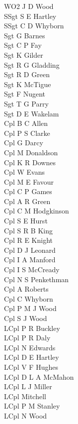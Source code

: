 \begin{multicols}{2}
  \noindent
  WO2 J D Wood \\
  SSgt S E Hartley \\
  SSgt C D Whyborn \\
  Sgt G Barnes \\
  Sgt C P Fay \\
  Sgt K Gilder \\
  Sgt R G Gladding \\
  Sgt R D Green \\
  Sgt K McTigue \\
  Sgt F Nugent \\
  Sgt T G Parry \\
  Sgt D E Wakelam \\
  Cpl B C Allen \\
  Cpl P S Clarke \\
  Cpl G Darcy \\
  Cpl M Donaldson \\
  Cpl K R Downes \\
  Cpl W Evans \\
  Cpl M E Favour \\
  Cpl C P Games \\
  Cpl A R Green \\
  Cpl C M Hodgkinson \\
  Cpl S E Hurst \\
  Cpl S R B King \\
  Cpl R E Knight \\
  Cpl D J Leonard \\
  Cpl I A Manford \\
  Cpl I S McCready \\
  Cpl N S Penkethman \\
  Cpl A Roberts \\
  Cpl C Whyborn \\
  Cpl P M J Wood \\
  Cpl S J Wood \\
  LCpl P R Buckley \\
  LCpl P R Daly \\
  LCpl N Edwards \\
  LCpl D E Hartley \\
  LCpl V F Hughes \\
  LCpl D L A McMahon \\
  LCpl L J Miller \\
  LCpl Mitchell \\
  LCpl P M Stanley \\
  LCpl N Wood \\

\end{multicols}
